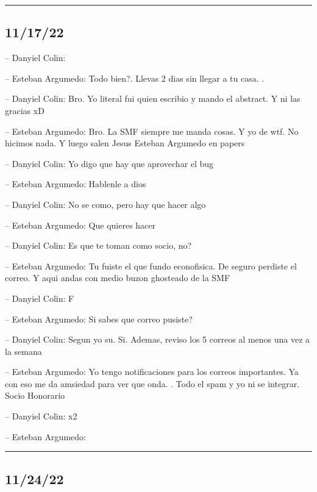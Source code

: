 \begin{center}\rule{0.5\linewidth}{0.5pt}\end{center}

\hypertarget{section-165}{%
\subsection{11/17/22}\label{section-165}}

-- Danyiel Colin:

-- Esteban Argumedo: Todo bien?. Llevas 2 dias sin llegar a tu casa. .

-- Danyiel Colin: Bro. Yo literal fui quien escribio y mando el
abstract. Y ni las gracias xD

-- Esteban Argumedo: Bro. La SMF siempre me manda cosas. Y yo de wtf. No
hicimos nada. Y luego salen Jesus Esteban Argumedo en papers

-- Danyiel Colin: Yo digo que hay que aprovechar el bug

-- Esteban Argumedo: Hablenle a dios

-- Danyiel Colin: No se como, pero hay que hacer algo

-- Esteban Argumedo: Que quieres hacer

-- Danyiel Colin: Es que te toman como socio, no?

-- Esteban Argumedo: Tu fuiste el que fundo econofisica. De seguro
perdiste el correo. Y aqui andas con medio buzon ghosteado de la SMF

-- Danyiel Colin: F

-- Esteban Argumedo: Si sabes que correo pusiste?

-- Danyiel Colin: Segun yo su. Si. Ademas, reviso los 5 correos al menos
una vez a la semana

-- Esteban Argumedo: Yo tengo notificaciones para los correos
importantes. Ya con eso me da amsiedad para ver que onda. . Todo el spam
y yo ni se integrar. Socio Honorario

-- Danyiel Colin: x2

-- Esteban Argumedo:

\begin{center}\rule{0.5\linewidth}{0.5pt}\end{center}

\hypertarget{section-166}{%
\subsection{11/24/22}\label{section-166}}

